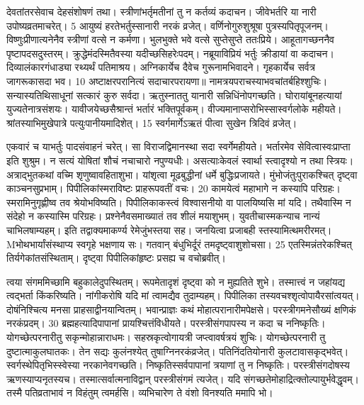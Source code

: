 देवतांतरसेवाच देहसंशोषणं तथा।
 स्त्रीणांभर्तृमतीनां तु न कर्तव्यं कदाचन।
 जीवेभर्तरि या नारी उपोष्यव्रतमाचरेत्।
 5 आयुष्यं हरतेभर्तुस्सानारी नरकं व्रजेत्।
 वर्णिनोगुरुशुश्रूषा पुत्रस्यपितृपूजनम्।
 विष्णुःप्रीणात्यनेनैव स्त्रीणां वत्से न कर्मणा।
 भुलभुक्ते भवे वत्से सुप्तेसुप्ते ततःप्रिये।
 आहूतागच्छननैव पृष्टापदसदुस्तरम्।
 क्रुद्धेमंदस्मितैवस्या यदीच्छसिहरेःपदम्।
 नब्रूयाविप्रियं भर्तुः क्रीडायां वा कदाचन।
 दिव्यालंकारगंधाड्या रथ्यर्थं पतिमाश्रय।
 अग्निकार्येच दैवेच गुरूनामभिवादने।
 गृहकार्येच सर्वत्र जागरूकासदा भव।
 10 अष्टाक्षरपरानित्यं सदाचारपरायणा॥ नामत्रयपराचस्याभवचांतर्बहिश्शुचिः।
 सन्यास्यतिथिसाधूनां सत्कारं कुरु सर्वदा।
 ऋतुस्नाततु यानारी सन्निधिंनोपगच्छति।
 घोरायांबूनहत्यायां युज्यतेनात्रसंशयः।
 यावीजयेच्छसैश्रान्तं भर्तारं भक्तिपूर्वकम्।
 वीज्यमानाप्सरोभिस्सास्वर्गलोके महीयते।
 श्रांतस्याभिमुखेपात्रे पत्युःपानीयमादिशेत्।
 15 स्वर्गमार्गेऽऋतं पीत्वा सुखेन त्रिदिवं व्रजेत्।
 
एकवारं च याभर्तुः पादसंवाहनं चरेत्।
 सा विराजद्विमानस्था सदा स्वर्गेमहीयते।
 भर्तारमेव सेवित्वास्वःप्राप्ता इति शुश्रुम।
 न सत्यं योषितां शौचं नचाचारो नपुण्यधीः।
 असत्याःकेवलं स्वार्था स्त्वादृश्यो न तथा स्त्रियः।
 अत्राद्भुतकथां वच्मि शृणुष्वावहिताशुभा।
 यांशृत्वा मूढबुद्धीनां धर्मे बुद्धिःप्रजायते।
 मुंभोजंतुःपुराकश्चित् दृष्ट्वा काञ्चनसुप्रभाम्।
 पिपीलिकांस्मराविष्टः प्राहरूपवतीं वचः।
 20 कामयेत्वं महाभागे न कस्यापि परिग्रहः।
 स्मरामिनुगृह्णीष्व तव श्रेयोभविष्यति।
 पिपीलिकाकस्त्वं विश्वासनीयो वा पालयिष्यसि मां यदि।
 तथैवास्मि न संदेहो न कस्यास्मि परिग्रहः।
 प्रश्नेनैवसमाख्यातं तव शीलं मयाशुभम्।
 युवतीचास्मकन्याच नान्यं चाभिलषाम्यहम्।
 इति तद्वाक्यमाकर्ण्य रेमेजुंभस्तया सह।
 जनयित्वा प्रजाबही स्तस्यामित्थमरीरमत्।
 Mभोथभार्यांसंस्थाप्य स्वगृहे भक्षणाय सः।
 गतवान् बंधुभिर्दूरं तमदृष्ट्वाशुशोचसा।
 25 एतस्मिन्नंतरेकश्चित् तिर्यगेकांतसंस्थिताम्।
 दृष्ट्वा पिपीलिकांहृष्टः प्रसह्य च वचोब्रवीत्।
 
त्वया संगममिच्छामि बहुकालेदुपस्थितम्।
 रूपमेतादृशं दृष्ट्वा को न मुह्यतिते शुभे।
 तस्मात्त्वं न जहांयद्य त्वद्भर्ता किंकरिष्यति।
 नांगीकरोषि यदि मां त्वामद्यैव तुदाम्यहम्।
 पिपीलिका तस्यवचश्शृत्वोपायैरसांत्वयत्।
 दोषंनिश्चित्य मनसा प्राहसाद्वीनयान्वितम्।
 भवान्प्राज्ञः कथं मोहात्परानारीमपेक्षसे।
 परस्त्रीगमनेसौख्यं क्षणिकं नरकंप्रदम्।
 30 ब्रह्महत्यादिपापानां प्रायश्चित्तंविधीयते।
 परस्त्रीसंगपापस्य न कदा च ननिष्कृतिः।
 योगच्छेत्परनारीतु सकृन्मोहान्नाराधमः।
 सहस्रकृत्वोगायत्री जप्त्वावर्षत्रयं शुचिः।
 योगच्छेत्परनारी तु दुष्टात्माकुलघातकः।
 तेन सद्यः कुलंनश्येत् तुषाग्निनरकंव्रजेत्।
 पतिनिंदतियोनारी कुलटावासकृद्भवेत्।
 स्वर्गस्थेपितृभिस्स्वेस्या नरकानेवगच्छति।
 निष्कृतिस्सर्वपापानां त्रयाणां तु न निष्कृतिः।
 परस्त्रीसंगदोषस्य ऋणस्याप्यनृतस्यच।
 तस्मात्सर्वात्मनाविद्वान् परस्त्रीसंगमं त्यजेत्।
 यदि संगच्छतेमोहाद्रित्क्तोल्पायुर्भवेद्धृवम्।
 तस्मै पतिव्रताभावं न विहंतुम् त्वमर्हसि।
 व्यभिचारेण ते वंशो विनश्यति ममापि भो।
 
